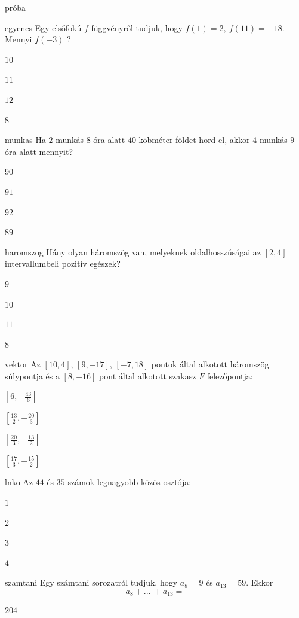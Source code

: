 \documentclass[12pt]{article}
\begin{document}
\begin{quiz}{próba}

\begin{multi}{egyenes}
Egy elsőfokú $f$ függvényről tudjuk, hogy $f(1)=2,\ f(11)=-18$. Mennyi $f(-3)$ ?
\item* $10$
\item  $11$
\item  $12$
\item  $8$
\end{multi}
\begin{multi}{munkas}
Ha $2$ munkás $8$ óra alatt $40$ köbméter földet hord el, akkor
$4$ munkás $9$ óra alatt mennyit? 

\item* $90$
\item  $91$
\item  $92$
\item  $89$
\end{multi}
\begin{multi}{haromszog}
Hány olyan háromszög van, melyeknek oldalhosszúságai az $[2,4]$ 
intervallumbeli pozitív egészek?
\item* $9$
\item  $10$
\item  $11$
\item  $8$
\end{multi}
\begin{multi}{vektor}
Az $\left[10, 4\right]$, $\left[9, -17\right]$, $\left[-7, 18\right]$ pontok által alkotott háromszög súlypontja és a $\left[8, -16\right]$ pont 
által alkotott szakasz $F$ felezőpontja:
\item* $\left[6, -\frac{43}{6}\right]$
\item  $\left[\frac{13}{2}, -\frac{20}{3}\right]$
\item  $\left[\frac{20}{3}, -\frac{13}{2}\right]$
\item  $\left[\frac{17}{3}, -\frac{15}{2}\right]$
\end{multi}
\begin{multi}{lnko}
Az $44$ és $35$ számok legnagyobb közös osztója:
\item* $1$
\item  $2$
\item  $3$
\item  $4$
\end{multi}
\begin{multi}{szamtani}
Egy számtani sorozatról tudjuk, hogy $a_{8}=9$ és $a_{13}=59$. Ekkor 
$$
a_{8}+{...\:} +a_{13}=
$$
\item* $204$

\end{multi}
\end{quiz}
\end{document}
